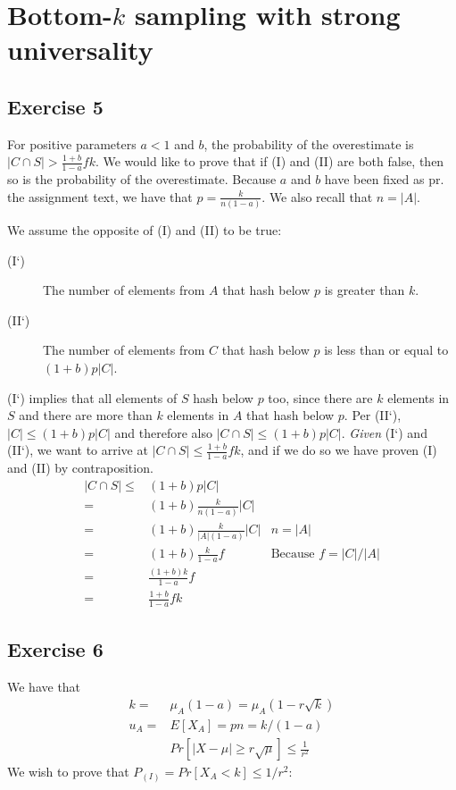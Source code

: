 \section{Bottom-$k$ sampling with strong universality}
\subsection{Exercise 5}
For positive parameters $a < 1$ and $b$, the probability of the
overestimate is $|C \cap S| > \frac{1+b}{1-a} fk$. We would like to
prove that if (I) and (II) are both false, then so is the probability
of the overestimate. Because $a$ and $b$ have been fixed as pr. the
assignment text, we have that $p=\frac{k}{n(1-a)}$. We also recall
that $n=|A|$.

We assume the opposite of (I) and (II) to be true:
%
\begin{description}
	\item[(I`)] The number of elements from $A$ that hash below $p$
	is greater than $k$.
	\item[(II`)] The number of elements from $C$ that hash below $p$
	is less than or equal to $(1+b) p |C|$.
\end{description}
%
(I`) implies that all elements of $S$ hash below $p$ too, since there are $k$
elements in $S$ and there are more than $k$ elements in $A$ that hash below
$p$. Per (II`), $|C|\leq (1+b)p|C|$ and therefore also 
$|C \cap S| \leq (1+b)p|C|$. \textit{Given} (I`) and (II`), we want to arrive 
at $|C \cap S| \leq \frac{1+b}{1-a} fk$, and if we do so we have proven (I) 
and (II) by contraposition.
%
\begin{align*}
	|C \cap S| 	\leq & (1+b)p|C| & \\
				=& (1+b) \frac{k}{n(1-a)} |C| & \\
				=& (1+b) \frac{k}{|A|(1-a)} |C| & \text{$n=|A|$}\\
				=& (1+b) \frac{k}{1-a} f & \text{Because $f=|C|/|A|$}\\
				=& \frac{(1+b)k}{1-a} f & \\
				=& \frac{1+b}{1-a} fk & 
\end{align*}

\subsection{Exercise 6}
We have that
%
\begin{align}
	k =& \mu_A(1-a) = \mu_A(1 - r \sqrt{k}) \label{eq:6:k} \\
	u_A =& E[X_A] = pn = k/(1-a) \label{eq:6:ua} \\
	& Pr\left[ |X - \mu| \geq r \sqrt{\mu} \right] \leq \frac{1}{r^2} \label{eq:6:pr}
\end{align}
%
We wish to prove that $P_{(I)} = Pr \left[ X_A < k\right] \leq 1/r^2$:

